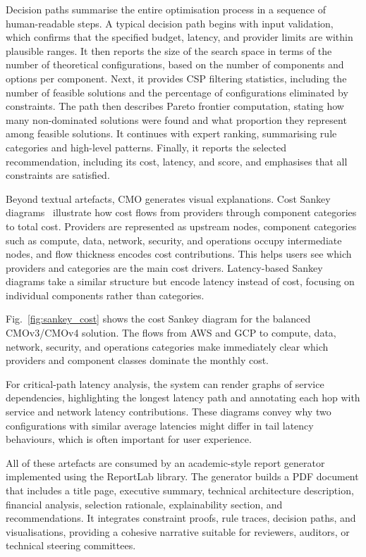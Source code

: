 \documentclass[journal]{IEEEtran}
\newcommand{\cmo}{CMO\xspace}
\newcommand{\cmothree}{CMOv3\xspace}
\newcommand{\cmofour}{CMOv4\xspace}
\begin{document}
Decision paths summarise the entire optimisation process in a sequence of
human-readable steps. A typical decision path begins with input validation,
which confirms that the specified budget, latency, and provider limits are
within plausible ranges. It then reports the size of the search space in terms
of the number of theoretical configurations, based on the number of components
and options per component. Next, it provides CSP filtering statistics, including
the number of feasible solutions and the percentage of configurations eliminated
by constraints. The path then describes Pareto frontier computation, stating how
many non-dominated solutions were found and what proportion they represent among
feasible solutions. It continues with expert ranking, summarising rule
categories and high-level patterns. Finally, it reports the selected
recommendation, including its cost, latency, and score, and emphasises that all
constraints are satisfied.

Beyond textual artefacts, \cmo generates visual explanations. Cost Sankey
diagrams~\cite{riehmann_sankey} illustrate how cost flows from providers through
component categories to total cost. Providers are represented as upstream nodes,
component categories such as compute, data, network, security, and operations
occupy intermediate nodes, and flow thickness encodes cost contributions. This
helps users see which providers and categories are the main cost drivers.
Latency-based Sankey diagrams take a similar structure but encode latency
instead of cost, focusing on individual components rather than categories.

Fig.~\ref{fig:sankey_cost} shows the cost Sankey diagram for the balanced
\cmothree/\cmofour solution. The flows from AWS and GCP to compute, data,
network, security, and operations categories make immediately clear which
providers and component classes dominate the monthly cost.

For critical-path latency analysis, the system can render graphs of service
dependencies, highlighting the longest latency path and annotating each hop
with service and network latency contributions. These diagrams convey why two
configurations with similar average latencies might differ in tail latency
behaviours, which is often important for user experience.

All of these artefacts are consumed by an academic-style report generator
implemented using the ReportLab library. The generator builds a PDF document
that includes a title page, executive summary, technical architecture
description, financial analysis, selection rationale, explainability section,
and recommendations. It integrates constraint proofs, rule traces, decision
paths, and visualisations, providing a cohesive narrative suitable for
reviewers, auditors, or technical steering committees.
\end{document}

